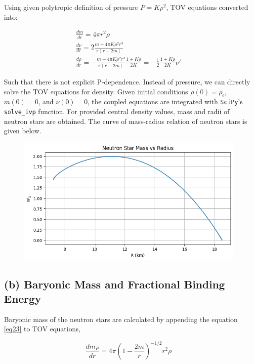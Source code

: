 \documentclass[aps,twocolumn,showpacs,preprintnumbers,nofootinbib,prl,superscriptaddress,groupedaddress]{revtex4-2}
\begin{document}
Using given polytropic definition of pressure $P = K\rho^2$, TOV equations converted into:

\begin{align}
		&\frac{dm}{dr} = 4\pi r^2\rho   & \\
	&\frac{d\nu}{dr} = 2\frac{m+4\pi K\rho^2r^3}{r(r-2m)}  &  \\
	&\frac{d\rho}{dr} = -\frac{m+4\pi K\rho^2 r^3}{r(r-2m)}\frac{1+K\rho}{2K} = -\frac{1}{2}\frac{1+K\rho}{2K}\nu'  &
\end{align}

Such that there is not explicit P-dependence. Instead of pressure, we can directly solve the TOV equations for density. Given initial conditions $\rho(0)=\rho_c$, $m(0)=0$, and $\nu(0)=0$, the coupled equations are integrated with \texttt{SciPy}'s \texttt{solve\_ivp} function. For provided central density values, mass and radii of neutron stars are obtained. The curve of mass-radius relation of neutron stars is given below.

\begin{figure}[!htb]
	\centering
	\includegraphics[width=1\linewidth]{Plots/einstein-part-a}
	\label{fig:einstein-part-a}
\end{figure}
\FloatBarrier
\subsection{(b) Baryonic Mass and Fractional Binding Energy}

Baryonic mass of the neutron stars are calculated by appending the equation \ref{eq23} to TOV equations,

\begin{equation}\label{eq23}
	\frac{dm_P}{dr} = 4\pi (1-\frac{2m}{r})^{-1/2}r^2\rho
\end{equation}
\end{document}

